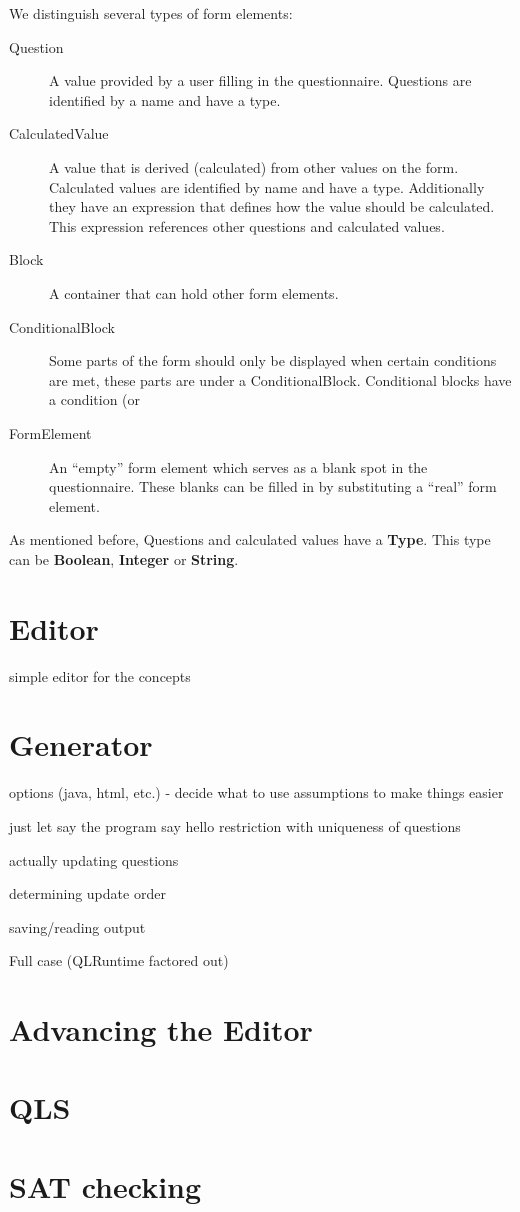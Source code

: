 \documentclass[11pt]{article}
\begin{document}
We distinguish several types of form elements:
\begin{description}
\item[Question] A value provided by a user filling in the questionnaire. Questions are identified by a name and have a type.
\item[CalculatedValue] A value that is derived (calculated) from other values on the form. Calculated values are identified by name and have a type. Additionally they have an expression that defines how the value should be calculated. This expression references other questions and calculated values.
\item[Block] A container that can hold other form elements.
\item[ConditionalBlock] Some parts of the form should only be displayed when certain conditions are met, these parts are under a ConditionalBlock. Conditional blocks have a condition (or 
\item[FormElement] An ``empty'' form element which serves as a blank spot in the questionnaire. These blanks can be filled in by substituting a ``real'' form element.
\end{description}

As mentioned before, Questions and calculated values have a \textbf{Type}. This type can be \textbf{Boolean}, \textbf{Integer} or \textbf{String}.

\section{Editor}
simple editor for the concepts

\section{Generator}
options (java, html, etc.) - decide what to use
assumptions to make things easier

just let say the program say hello
restriction with uniqueness of questions

actually updating questions

determining update order

saving/reading output

Full case (QLRuntime factored out)

\section{Advancing the Editor}

\section{QLS}

\section{SAT checking}
\end{document}
